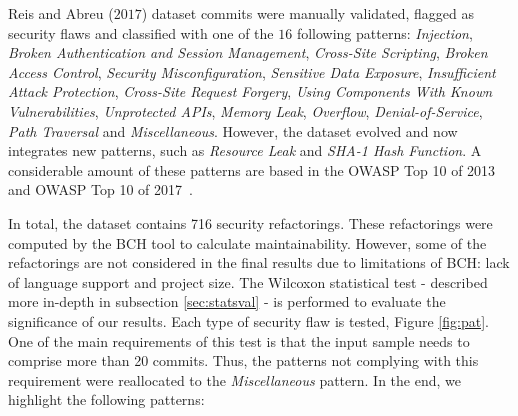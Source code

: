 \documentclass[10pt,conference]{IEEEtran}
\begin{document}
Reis and Abreu ($2017$) dataset commits were manually validated, flagged as security flaws and classified with one of the $16$ following patterns: \textit{Injection}, \textit{Broken Authentication and Session Management}, \textit{Cross-Site Scripting}, \textit{Broken Access Control}, \textit{Security Misconfiguration}, \textit{Sensitive Data Exposure}, \textit{Insufficient Attack Protection}, \textit{Cross-Site Request Forgery}, \textit{Using Components With Known Vulnerabilities}, \textit{Unprotected APIs}, \textit{Memory Leak}, \textit{Overflow}, \textit{Denial-of-Service}, \textit{Path Traversal} and \textit{Miscellaneous}. However, the dataset evolved and now integrates new patterns, such as \textit{Resource Leak} and \textit{SHA-1 Hash Function}. A considerable amount of these patterns are based in the OWASP Top 10 of 2013~\cite{oswap:2013} and OWASP Top 10 of 2017~\cite{oswap:2017}.

In total, the dataset contains 716 security refactorings. These refactorings were computed by the BCH tool to calculate maintainability. However, some of the refactorings are not considered in the final results due to limitations of BCH: lack of language support and project size. The Wilcoxon statistical test - described more in-depth in subsection \ref{sec:statsval} - is performed to evaluate the significance of our results. Each type of security flaw is tested, Figure \ref{fig:pat}. One of the main requirements of this test is that the input sample needs to comprise more than 20 commits. Thus, the patterns not complying with this requirement were reallocated to the \textit{Miscellaneous} pattern. In the end, we highlight the following patterns:
\end{document}
